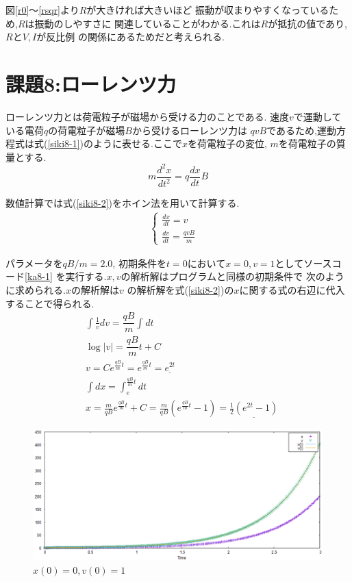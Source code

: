 図\ref{r0}～\ref{rsqr}より$R$が大きければ大きいほど
振動が収まりやすくなっているため,$R$は振動のしやすさに
関連していることがわかる.これは$R$が抵抗の値であり,$R$と$V,I$が反比例
の関係にあるためだと考えられる.
\section{課題8:ローレンツ力}
ローレンツ力とは荷電粒子が磁場から受ける力のことである.
速度$v$で運動している電荷$q$の荷電粒子が磁場$B$から受けるローレンツ力は
$qvB$であるため,運動方程式は式(\ref{siki8-1})のように表せる.ここで$x$を荷電粒子の変位,
$m$を荷電粒子の質量とする.
\begin{equation}
m\frac{d^2x}{dt^2}=q\frac{dx}{dt}B
\label{siki8-1}
\end{equation}

数値計算では式(\ref{siki8-2})をホイン法を用いて計算する.
\begin{eqnarray}
  \begin{cases}
\frac{dx}{dt}=v&\\
\frac{dv}{dt}= \frac{qvB}{m}&
 \label{siki8-2}
  \end{cases}
\end{eqnarray}


パラメータを$qB/m=2.0$,
初期条件を$t=0$において$x=0,v=1$としてソースコード\ref{ka8-1}
を実行する.$x,v$の解析解はプログラムと同様の初期条件で
次のように求められる.$x$の解析解は$v$
の解析解を式(\ref{siki8-2})の$x$に関する式の右辺に代入することで得られる.
\begin{equation*}
\begin{split}
&\int \frac{1}{v}dv=\dfrac{qB}{m}\int_{} dt\\
&\log \left| v\right| =\dfrac{qB}{m}t+C\\
&v=Ce^{\frac{qB}{m}t}=e^{\frac{qB}{m}t}=\underline{e^{2t}}\\
&\int dx=\int_e^{\frac{qB}{m}t} dt\\
&x=\frac{m}{qB}e^{\frac{qB}{m}t}+C=\frac{m}{qB}(e^{\frac{qB}{m}t}-1)=\underline{\frac{1}{2}(e^{2t}-1)}
\end{split}
\end{equation*}
\begin{figure}[htbp]
\centering
\includegraphics[scale=0.7]{./img/kadai8-1.eps}
\caption{$x(0)=0,v(0)=1$}
\label{kadai8-1}
\end{figure}

